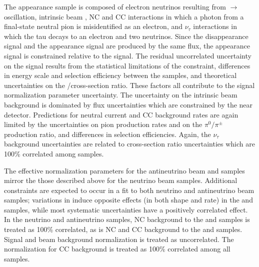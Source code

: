 The \nue appearance sample is composed of electron neutrinos resulting from \numu$\rightarrow$\nue oscillation,
intrinsic beam \nue, NC and
\numu CC interactions in which a photon from a final-state neutral pion is
misidentified as an electron, and $\nu_{\tau}$ interactions in which the tau decays to an electron and
two neutrinos. Since the
\numu disappearance signal and the \nue appearance signal are produced by the same flux,
the \nue appearance signal is constrained relative to the \numu
signal. The residual uncorrelated uncertainty on the \nue signal results from the statistical
limitations of the \numu constraint, differences in energy scale and selection efficiency between the samples,
and theoretical uncertainties on the \nue/\numu cross-section ratio.
These factors all contribute to the \nue signal normalization parameter uncertainty. The uncertainty on the intrinsic
beam \nue background is dominated by flux uncertainties which are constrained by the near detector.
Predictions for neutral current and \numu CC background rates are again limited by the uncertainties on pion
production rates and
on the $\pi^{0}/\pi^{\pm}$ production ratio, and
differences in selection efficiencies.
Again, the $\nu_{\tau}$ background uncertainties are related to cross-section ratio uncertainties
which are 100\% correlated among samples.


The effective normalization parameters for the antineutrino beam \anue and \anumu samples mirror the
those described above for the neutrino beam samples.
Additional constraints are expected to occur in a fit to both neutrino and antineutrino beam samples;
variations in \deltacp induce opposite effects (in both shape and rate) in the \nue and \anue samples,
while most systematic uncertainties have a positively correlated effect.
In the neutrino and antineutrino samples,
NC background to the \numu and \anumu samples is treated as 100\% correlated,
as is NC and \numu CC background to the \nue and \anue samples.
Signal and beam \nue background normalization is treated as uncorrelated.
The normalization for \nutau CC background is treated as 100\% correlated among all samples.

